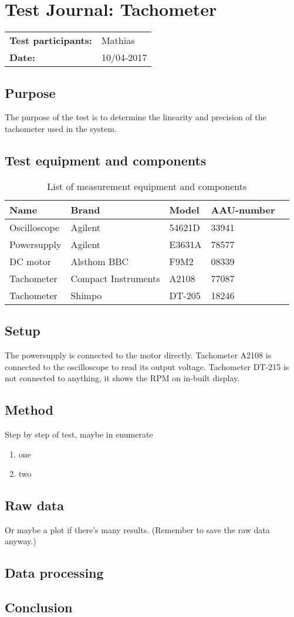 \graphicspath{{figures/design/}}
\chapter{Test Journal: Tachometer}
\begin{table}[!h]
\begin{tabular}{l l}
\textbf{Test participants:} & Mathias  \\
\textbf{Date:}  & 10/04-2017
\end{tabular}
\end{table}

\section*{Purpose}
The purpose of the test is to determine the linearity and precision of the tachometer used in the system.
\section*{Test equipment and components}
\begin{table}[htbp]
	\centering
	\caption{List of measurement equipment and components}\label{tab_appendix:RPMSetup}
	\begin{tabularx}{\textwidth}{lXXXX}
		Name & Brand & Model & AAU-number \\ \toprule \rowcolor{lightGrey}
		Oscilloscope	& Agilent & 54621D & 33941 	\\
		Powersupply	& Agilent & E3631A & 78577\\ 	
		DC motor & Alsthom BBC & F9M2& 08339\\
		Tachometer & Compact \newline Instruments & A2108& 77087 \\
		Tachometer & Shimpo& DT-205 & 18246
	\end{tabularx}
\end{table}
\section*{Setup}
The powersupply is connected to the motor directly. Tachometer A2108 is connected to the oscilloscope to read its output voltage. Tachometer DT-215 is not connected to anything, it shows the RPM on in-built display.  
\section*{Method}
Step by step of test, maybe in enumerate
\begin{enumerate}
\item one
\item two
\end{enumerate}
\section*{Raw data}
Or maybe a plot if there's many results. (Remember to save the raw data anyway.)
\section*{Data processing}
\section*{Conclusion}


